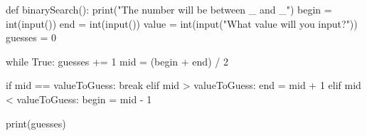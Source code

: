 \documentclass[main.tex]{subfiles}
\begin{document}
\begin{python}
    def binarySearch():
        print("The number will be between _ and _\n")
        begin = int(input())
        end = int(input())
        value = int(input("What value will you input?\n"))
        guesses = 0

        while True:
            guesses += 1             
            mid = (begin + end) / 2

            if mid == valueToGuess:
                break
            elif mid > valueToGuess:
                end = mid + 1
            elif mid < valueToGuess:
                begin = mid - 1

        print(guesses)

\end{python}

\end{document}
